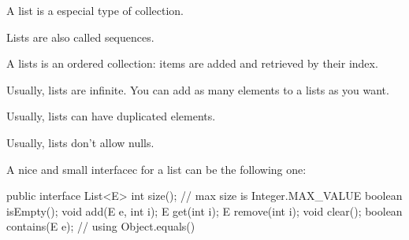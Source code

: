 \documentclass[a4paper, 9pt]{extarticle}
\begin{document}
A list is a especial type of collection.

Lists are also called sequences.

A lists is an ordered collection: items are added and retrieved by their index.

Usually, lists are infinite. You can add as many elements to a lists as you want.

Usually, lists can have duplicated elements.

Usually, lists don't allow nulls.

A nice and small interfacec for a list can be the following one:

public interface List<E> {
  int     size(); // max size is Integer.MAX\_VALUE
  boolean isEmpty();
  void    add(E e, int i);
  E       get(int i);
  E       remove(int i);
  void    clear();
  boolean contains(E e); // using Object.equals()
}
\end{document}
